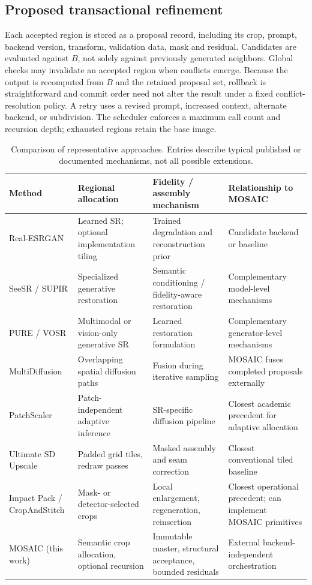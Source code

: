 \documentclass[10pt,twocolumn]{article}
\begin{document}
\subsection{Proposed transactional refinement}
Each accepted region is stored as a proposal record, including its crop, prompt, backend version, transform, validation data, mask and residual. Candidates are evaluated against $B$, not solely against previously generated neighbors. Global checks may invalidate an accepted region when conflicts emerge. Because the output is recomputed from $B$ and the retained proposal set, rollback is straightforward and commit order need not alter the result under a fixed conflict-resolution policy. A retry uses a revised prompt, increased context, alternate backend, or subdivision. The scheduler enforces a maximum call count and recursion depth; exhausted regions retain the base image.
\begin{table}[t]
\centering\small
\caption{Comparison of representative approaches. Entries describe typical published or documented mechanisms, not all possible extensions.}
\label{tab:prior}
\begin{tabularx}{\textwidth}{@{}p{}p{}p{}X@{}}
\toprule
Method & Regional allocation & Fidelity / assembly mechanism & Relationship to MOSAIC \\\midrule
Real-ESRGAN \cite{realesr} & Learned SR; optional implementation tiling & Trained degradation and reconstruction prior & Candidate backend or baseline \\
SeeSR / SUPIR \cite{seesr,supir} & Specialized generative restoration & Semantic conditioning / fidelity-aware restoration & Complementary model-level mechanisms \\
PURE / VOSR \cite{pure,vosr} & Multimodal or vision-only generative SR & Learned restoration formulation & Complementary generator-level mechanisms \\
MultiDiffusion \cite{multi} & Overlapping spatial diffusion paths & Fusion during iterative sampling & MOSAIC fuses completed proposals externally \\
PatchScaler \cite{patch} & Patch-independent adaptive inference & SR-specific diffusion pipeline & Closest academic precedent for adaptive allocation \\
Ultimate SD Upscale \cite{ultimate} & Padded grid tiles, redraw passes & Masked assembly and seam correction & Closest conventional tiled baseline \\
Impact Pack / CropAndStitch \cite{impact,crop} & Mask- or detector-selected crops & Local enlargement, regeneration, reinsertion & Closest operational precedent; can implement MOSAIC primitives \\
MOSAIC (this work) & Semantic crop allocation, optional recursion & Immutable master, structural acceptance, bounded residuals & External backend-independent orchestration \\
\bottomrule
\end{tabularx}
\end{table}
\end{document}
